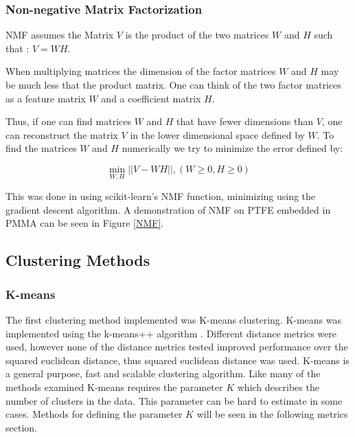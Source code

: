 \documentclass[a4paper,11pt]{article}
\begin{document}
\subsubsection{Non-negative Matrix Factorization}

NMF assumes the Matrix $V$ is the product of the two matrices $W$ and $H$ such that : $V = WH$. 

When multiplying matrices the dimension of the factor matrices $W$ and $H$ may be much less that the product matrix. One can think of the two factor matrices as a feature matrix $W$ and a coefficient matrix $H$.

Thus, if one can find matrices $W$ and $H$ that have fewer dimensions than $V$, one can reconstruct the matrix $V$ in the lower dimensional space defined by $W$. To find the matrices $W$ and $H$ numerically we try to minimize the error defined by:

\begin{equation}
\min_{W,H} || V - WH ||, ( W \geq 0, H \geq 0 )
\end{equation}

This was done in using scikit-learn's NMF function, minimizing using the gradient descent algorithm. A demonstration of NMF on PTFE embedded in PMMA can be seen in Figure \ref{NMF}.

\subsection{Clustering Methods}

\subsubsection{K-means}

The first clustering method implemented was K-means clustering. K-means was implemented using the k-means++ algorithm \cite{ArthurK-means++:Seeding}. Different distance metrics were used, however none of the distance metrics tested improved performance over the squared euclidean distance, thus squared euclidean distance was used. K-means is a general purpose, fast and scalable clustering algorithm. Like many of the methods examined K-means requires the parameter $K$ which describes the number of clusters in the data. This parameter can be hard to estimate in some cases. Methods for defining the parameter $K$ will be seen in the following metrics section.
\end{document}

